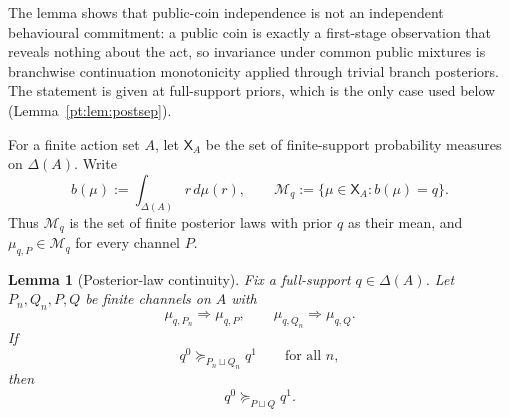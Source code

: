 \documentclass[11pt,a4paper]{article}
\newtheorem{lemma}[theorem]{Lemma}
\theoremstyle{definition}
\newcommand{\1}{\mathbf 1}
\begin{document}
The lemma shows that public-coin independence is not an independent behavioural commitment: a public coin is exactly a
first-stage observation that reveals nothing about the act, so invariance under common public mixtures is branchwise
continuation monotonicity applied through trivial branch posteriors.  The statement is given at full-support priors,
which is the only case used below (Lemma~\ref{pt:lem:postsep}).

For a finite action set $A$, let $\mathsf X_A$ be the set of finite-support probability measures on $\Delta(A)$.  Write
\[
b(\mu):=\int_{\Delta(A)}r\,d\mu(r),
\qquad
\mathcal M_q:=\{\mu\in\mathsf X_A:b(\mu)=q\}.
\]
Thus $\mathcal M_q$ is the set of finite posterior laws with prior $q$ as their mean, and
$\mu_{q,P}\in\mathcal M_q$ for every channel $P$.

\begin{lemma}[Posterior-law continuity]\label{pt:lem:plcont}
Fix a full-support $q\in\Delta(A)$.  Let $P_n,Q_n,P,Q$ be finite channels on $A$ with
\[
\mu_{q,P_n}\Rightarrow \mu_{q,P},
\qquad
\mu_{q,Q_n}\Rightarrow \mu_{q,Q}.
\]
If
\[
q^0\succeq_{P_n\sqcup Q_n}q^1
\qquad\text{for all }n,
\]
then
\[
q^0\succeq_{P\sqcup Q}q^1.
\]
\end{lemma}
\end{document}
